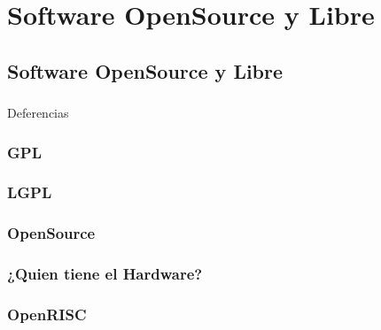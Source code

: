 \chapter{Software OpenSource y Libre}

	

\section{Software OpenSource y Libre}


		\subsection{}{Deferencias}%

		\subsection{GPL}
		\subsection{LGPL}
		\subsection{OpenSource}

		\subsection{¿Quien tiene el Hardware?}

		\subsection{OpenRISC}



